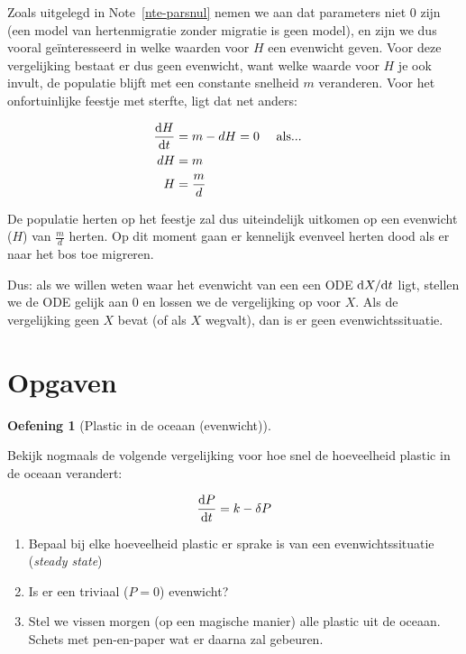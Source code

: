 \documentclass[
  a4paper,
]{scrbook}
\providecommand{\tightlist}{%
  \setlength{\itemsep}{0pt}\setlength{\parskip}{0pt}}\usepackage{longtable,booktabs,array}
\theoremstyle{definition}
\newtheorem{exercise}{Oefening}[chapter]
\theoremstyle{remark}
\begin{document}
Zoals uitgelegd in Note~\ref{nte-parsnul} nemen we aan dat parameters
niet \(0\) zijn (een model van hertenmigratie zonder migratie is geen
model), en zijn we dus vooral geïnteresseerd in welke waarden voor \(H\)
een evenwicht geven. Voor deze vergelijking bestaat er dus geen
evenwicht, want welke waarde voor \(H\) je ook invult, de populatie
blijft met een constante snelheid \(m\) veranderen. Voor het
onfortuinlijke feestje met sterfte, ligt dat net anders:

\begin{align*}
    \mathchoice{\frac{\mathrm{d}H}
{\mathrm{d}t}}{\mathrm{d}H/\mathrm{d}t}
{\mathrm{d}H/\mathrm{d}t}
{\mathrm{d}H/\mathrm{d}t} &= m - dH = 0 \quad \text{ als...}\\
    dH &= m & \\
    H &= \frac{m}{d} &
\end{align*}

De populatie herten op het feestje zal dus uiteindelijk uitkomen op een
evenwicht (\(H\)) van \(\frac{m}{d}\) herten. Op dit moment gaan er
kennelijk evenveel herten dood als er naar het bos toe migreren.

Dus: als we willen weten waar het evenwicht van een een ODE
\(\mathchoice{\frac{\mathrm{d}X}
{\mathrm{d}t}}{\mathrm{d}X/\mathrm{d}t}
{\mathrm{d}X/\mathrm{d}t}
{\mathrm{d}X/\mathrm{d}t}\) ligt, stellen we de ODE gelijk aan \(0\) en
lossen we de vergelijking op voor \(X\). Als de vergelijking geen \(X\)
bevat (of als \(X\) wegvalt), dan is er geen evenwichtssituatie.

\section{Opgaven}\label{opgaven-4}

\begin{exercise}[Plastic in de oceaan
(evenwicht)]\protect\hypertarget{exr-eenheden-tussen2}{}\label{exr-eenheden-tussen2}

Bekijk nogmaals de volgende vergelijking voor hoe snel de hoeveelheid
plastic in de oceaan verandert:

\begin{align}
\mathchoice{\frac{\mathrm{d}P}
{\mathrm{d}t}}{\mathrm{d}P/\mathrm{d}t}
{\mathrm{d}P/\mathrm{d}t}
{\mathrm{d}P/\mathrm{d}t} = k - \delta P
\end{align}

\begin{enumerate}
\def\labelenumi{\alph{enumi}.}
\tightlist
\item
  Bepaal bij elke hoeveelheid plastic er sprake is van een
  evenwichtssituatie (\emph{steady state})
\item
  Is er een triviaal (\(P=0\)) evenwicht?
\item
  Stel we vissen morgen (op een magische manier) alle plastic uit de
  oceaan. Schets met pen-en-paper wat er daarna zal gebeuren.
\end{enumerate}

\end{exercise}
\end{document}
